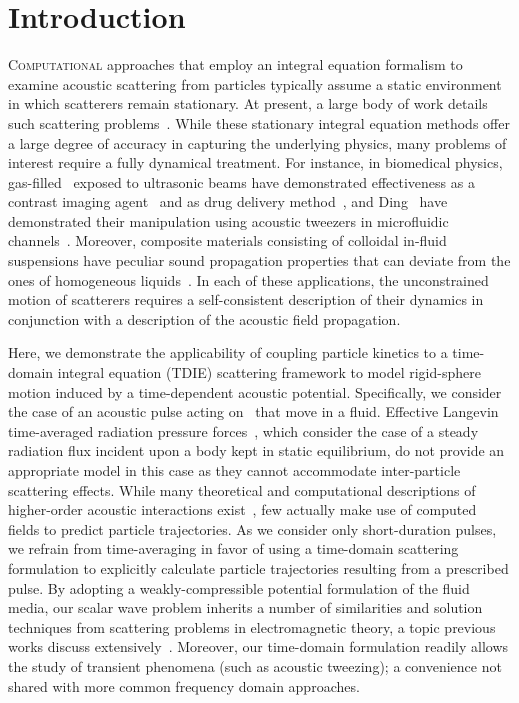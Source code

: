 \section{Introduction}

\lettrine[lines=3, depth=1]{C}{omputational} approaches that employ an integral equation formalism to examine acoustic scattering from particles typically assume a static environment in which scatterers remain stationary.
At present, a large body of work details such scattering problems~\cite{Waterman1969, Ding1989, Ye1997}.
While these stationary integral equation methods offer a large degree of accuracy in capturing the underlying physics, many problems of interest require a fully dynamical treatment.
For instance, in biomedical physics, gas-filled \bubbles\ exposed to ultrasonic beams have demonstrated effectiveness as a contrast imaging agent~\cite{Blomley2001} and as drug delivery method~\cite{Allen2002,Hernot2008}, and Ding \etal\ have demonstrated their manipulation using acoustic tweezers in microfluidic channels~\cite{Ding2012}.
Moreover, composite materials consisting of colloidal in-fluid suspensions have peculiar sound propagation properties that can deviate from the ones of homogeneous liquids~\cite{Ye1993}.
In each of these applications, the unconstrained motion of scatterers requires a self-consistent description of their dynamics in conjunction with a description of the acoustic field propagation.

Here, we demonstrate the applicability of coupling particle kinetics to a time-domain integral equation (TDIE) scattering framework to model rigid-sphere motion induced by a time-dependent acoustic potential.
Specifically, we consider the case of an acoustic pulse acting on \bubbles\ that move in a fluid.
Effective Langevin time-averaged radiation pressure forces~\cite{King1934, Borgnis1953}, which consider the case of a steady radiation flux incident upon a body kept in static equilibrium, do not provide an appropriate model in this case as they cannot accommodate inter-particle scattering effects.
While many theoretical and computational descriptions of higher-order acoustic interactions exist~\cite{Gumerov2002, Doinikov2004, Doinikov2005, Ilinskii2007, Azizoglu2009}, few actually make use of computed fields to predict particle trajectories.
As we consider only short-duration pulses, we refrain from time-averaging in favor of using a time-domain scattering formulation to explicitly calculate particle trajectories resulting from a prescribed pulse.
By adopting a weakly-compressible potential formulation of the fluid media, our scalar wave problem inherits a number of similarities and solution techniques from scattering problems in electromagnetic theory, a topic previous works discuss extensively~\cite{Tsang1998,Gumerov2002,Li2014}.
Moreover, our time-domain formulation readily allows the study of transient phenomena (such as acoustic tweezing); a convenience not shared with more common frequency domain approaches.

